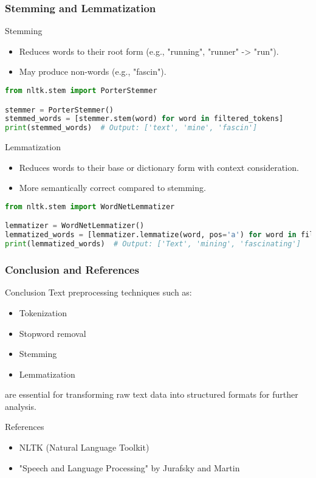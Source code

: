 \documentclass[aspectratio=169]{beamer}
\begin{document}
\begin{frame}[fragile]
    \frametitle{Stemming and Lemmatization}
    \begin{block}{Stemming}
        \begin{itemize}
            \item Reduces words to their root form (e.g., "running", "runner" -> "run").
            \item May produce non-words (e.g., "fascin").
        \end{itemize}
        \begin{lstlisting}[language=Python]
from nltk.stem import PorterStemmer

stemmer = PorterStemmer()
stemmed_words = [stemmer.stem(word) for word in filtered_tokens]
print(stemmed_words)  # Output: ['text', 'mine', 'fascin']
        \end{lstlisting}
    \end{block}

    \begin{block}{Lemmatization}
        \begin{itemize}
            \item Reduces words to their base or dictionary form with context consideration.
            \item More semantically correct compared to stemming.
        \end{itemize}
        \begin{lstlisting}[language=Python]
from nltk.stem import WordNetLemmatizer

lemmatizer = WordNetLemmatizer()
lemmatized_words = [lemmatizer.lemmatize(word, pos='a') for word in filtered_tokens]
print(lemmatized_words)  # Output: ['Text', 'mining', 'fascinating']
        \end{lstlisting}
    \end{block}
\end{frame}

\begin{frame}[fragile]
    \frametitle{Conclusion and References}
    \begin{block}{Conclusion}
        Text preprocessing techniques such as:
        \begin{itemize}
            \item Tokenization
            \item Stopword removal
            \item Stemming
            \item Lemmatization
        \end{itemize}
        are essential for transforming raw text data into structured formats for further analysis.
    \end{block}
    \begin{block}{References}
        \begin{itemize}
            \item NLTK (Natural Language Toolkit)
            \item "Speech and Language Processing" by Jurafsky and Martin
        \end{itemize}
    \end{block}
\end{frame}
\end{document}
